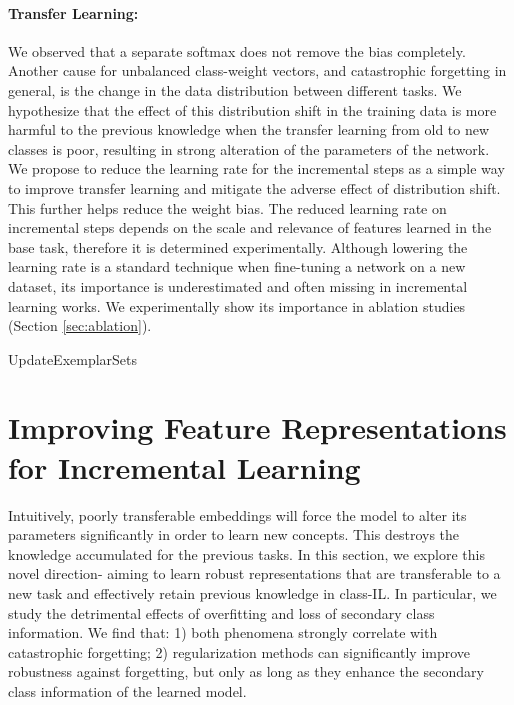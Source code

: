 \documentclass[final]{cvpr}
\begin{document}
\paragraph{Transfer Learning:}
We observed that a separate softmax does not remove the bias completely. Another cause for unbalanced class-weight vectors, and catastrophic forgetting in general, is the change in the data distribution between different tasks. We hypothesize that the effect of this distribution shift in the training data is more harmful to the previous knowledge when the transfer learning from old to new classes is poor, resulting in strong alteration of the parameters of the network. 
We propose to reduce the learning rate for the incremental steps as a simple way to improve transfer learning and mitigate the adverse effect of distribution shift. This further helps reduce the weight bias. The reduced learning rate on incremental steps depends on the scale and relevance of features learned in the base task, therefore it is determined experimentally.
Although lowering the learning rate is a standard technique when fine-tuning a network on a new dataset, its importance is underestimated and often missing in incremental learning works. We experimentally show its importance in ablation studies (Section \ref{sec:ablation}). 



\begin{algorithm}
\Indentp{0.5em}
\Indm 

\Indp
{}
\caption{UpdateExemplarSets} \label{alg2}
\end{algorithm}



 \section{Improving Feature Representations for Incremental Learning}
Intuitively, poorly transferable embeddings will force the model to alter its parameters significantly in order to learn new concepts. This destroys the knowledge accumulated for the previous tasks. 
In this section, we explore this novel direction- aiming to learn robust representations that are transferable to a new task and effectively retain previous knowledge in class-IL. 
In particular, we study the detrimental effects of overfitting and loss of secondary class information. 
We find that: 1) both phenomena strongly correlate with catastrophic forgetting; 2) regularization methods can significantly improve robustness against forgetting, but only as long as they enhance the secondary class information of the learned model.
\end{document}
